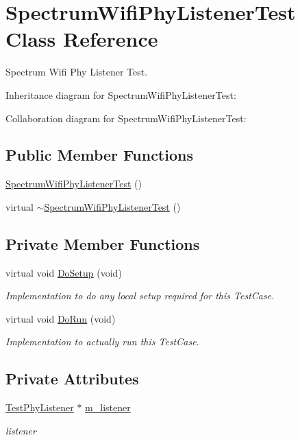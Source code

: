 \hypertarget{classSpectrumWifiPhyListenerTest}{}\section{Spectrum\+Wifi\+Phy\+Listener\+Test Class Reference}
\label{classSpectrumWifiPhyListenerTest}


Spectrum Wifi Phy Listener Test.  




Inheritance diagram for Spectrum\+Wifi\+Phy\+Listener\+Test\+:


Collaboration diagram for Spectrum\+Wifi\+Phy\+Listener\+Test\+:
\subsection*{Public Member Functions}
\begin{DoxyCompactItemize}
\item 
\hyperlink{classSpectrumWifiPhyListenerTest_ad4567f6d609a3e6d7f360363998bf19e}{Spectrum\+Wifi\+Phy\+Listener\+Test} ()
\item 
virtual \hyperlink{classSpectrumWifiPhyListenerTest_a3e61605a9ddd9da1e8b295740b8bb60f}{$\sim$\+Spectrum\+Wifi\+Phy\+Listener\+Test} ()
\end{DoxyCompactItemize}
\subsection*{Private Member Functions}
\begin{DoxyCompactItemize}
\item 
virtual void \hyperlink{classSpectrumWifiPhyListenerTest_a2649c02c0afb6632b514e9f81ad77cb9}{Do\+Setup} (void)
\begin{DoxyCompactList}\small\item\em Implementation to do any local setup required for this Test\+Case. \end{DoxyCompactList}\item 
virtual void \hyperlink{classSpectrumWifiPhyListenerTest_a357f2be95efbb227365e540b9031748b}{Do\+Run} (void)
\begin{DoxyCompactList}\small\item\em Implementation to actually run this Test\+Case. \end{DoxyCompactList}\end{DoxyCompactItemize}
\subsection*{Private Attributes}
\begin{DoxyCompactItemize}
\item 
\hyperlink{classTestPhyListener}{Test\+Phy\+Listener} $\ast$ \hyperlink{classSpectrumWifiPhyListenerTest_a648872ae7d21db921a27d2520991fee0}{m\+\_\+listener}
\begin{DoxyCompactList}\small\item\em listener \end{DoxyCompactList}\end{DoxyCompactItemize}
